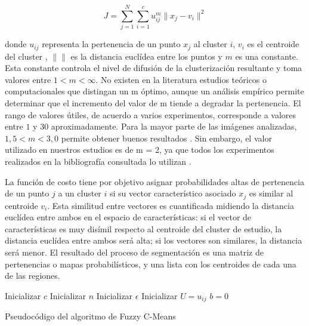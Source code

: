 \[\label{eq:solve} J = \sum_{j=1}^{N} \sum_{i=1}^{c} u_{ij}^m \lVert x_j- v_i \rVert^2\]

donde $u_{ij}$ representa la pertenencia de un punto $x_j$ al cluster $i$, $v_i$ es el centroide del cluster , $\lVert \rVert$ es la distancia euclídea entre los puntos y $m$ es una constante. Esta constante controla el nivel de difusión de la clusterización resultante \citep{chuang2006fuzzy} y toma valores entre $1 < m < \infty$. No existen en la literatura estudios teóricos o computacionales que distingan un m óptimo, aunque un análisis empírico permite determinar que el incremento del valor de m tiende a degradar la pertenencia. El rango de valores útiles, de acuerdo a varios experimentos, corresponde a valores entre $1$ y $30$ aproximadamente. Para la mayor parte de las imágenes analizadas, $1,5 < m < 3,0$ permite obtener buenos resultados \citep{bezdek1984fcm}. Sin embargo, el valor utilizado en nuestros estudios es de m = 2, ya que todos los experimentos realizados en la bibliografía consultada lo utilizan \citep{caldairou2011non, yang2005fuzzy, chuang2006fuzzy}.

La función de costo tiene por objetivo asignar probabilidades altas de pertenencia de un punto $j$ a un cluster $i$ si su vector característico asociado $x_j$ es similar al centroide $v_i$. Esta similitud entre vectores es cuantificada midiendo la distancia euclídea entre ambos en el espacio de características: si el vector de características es muy disímil respecto al centroide del cluster de estudio, la distancia euclídea entre ambos será alta; si los vectores son similares, la distancia será menor. El resultado del proceso de segmentación es una matriz de pertenencias o mapas probabilísticos, y una lista con los centroides de cada una de las regiones.



\begin{algorithm}[H]
Inicializar $c$ 
Inicializar $n$ 
Inicializar $\epsilon$\;
Inicializar $U = u_{ij}$ 
$b = 0$\;
\caption{Pseudocódigo del algoritmo de Fuzzy C-Means}
\label{lst:fcm-alg}
\end{algorithm}


